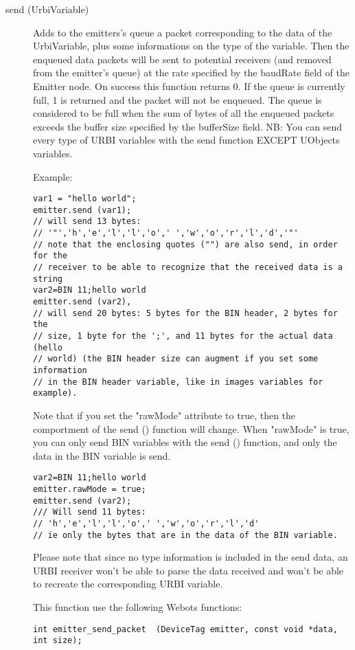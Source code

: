 \noindent
\begin{description}
\item[{send (UrbiVariable)}] Adds to the emitters's queue a packet
  corresponding to the data of the UrbiVariable, plus some
  informations on the type of the variable. Then the enqueued data
  packets will be sent to potential receivers (and removed from the
  emitter's queue) at the rate specified by the baudRate field of the
  Emitter node. On success this function returns 0. If the queue is
  currently full, 1 is returned and the packet will not be
  enqueued. The queue is considered to be full when the sum of bytes
  of all the enqueued packets exceeds the buffer size specified by the
  bufferSize field.  NB: You can send every type of URBI variables
  with the send function EXCEPT UObjects variables.


          Example:


\begin{lstlisting}[firstnumber=1,]
var1 = "hello world";
emitter.send (var1);
// will send 13 bytes:
// '"','h','e','l','l','o',' ','w','o','r','l','d','"'
// note that the enclosing quotes ("") are also send, in order for the
// receiver to be able to recognize that the received data is a string
var2=BIN 11;hello world
emitter.send (var2),
// will send 20 bytes: 5 bytes for the BIN header, 2 bytes for the
// size, 1 byte for the ';', and 11 bytes for the actual data (hello
// world) (the BIN header size can augment if you set some information
// in the BIN header variable, like in images variables for example).
\end{lstlisting}

Note that if you set the "rawMode" attribute to true, then the
comportment of the send () function will change. When "rawMode" is
true, you can only send BIN variables with the send () function, and
only the data in the BIN variable is send.


\begin{lstlisting}[firstnumber=1,]
var2=BIN 11;hello world
emitter.rawMode = true;
emitter.send (var2);
/// Will send 11 bytes:
// 'h','e','l','l','o',' ','w','o','r','l','d'
// ie only the bytes that are in the data of the BIN variable.
\end{lstlisting}

Please note that since no type information is included in the send
data, an URBI receiver won't be able to parse the data received and
won't be able to recreate the corresponding URBI variable.


This function use the following Webots functions:


\begin{lstlisting}[firstnumber=1,]
int emitter_send_packet  (DeviceTag emitter, const void *data, int size);
\end{lstlisting}
\end{description}

